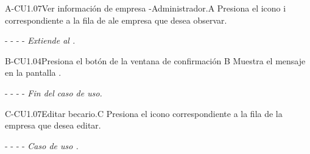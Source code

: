\begin{UCtrayectoriaA}{A-CU1.07}{Ver información de empresa -Administrador.}{A}
	     \UCpaso[\UCactor]Presiona el icono \textcircled{i} correspondiente a la fila de ale empresa que desea observar.
	    \item[- -] - - {\em Extiende al .}
	\end{UCtrayectoriaA}
	
	\begin{UCtrayectoriaA}{B-CU1.04}{Presiona el botón  de la ventana de confirmación }{B}
		\UCpaso[\UCsist] Muestra el mensaje  en la pantalla .
		\item[- -] - - {\em Fin del caso de uso.} 
	\end{UCtrayectoriaA}


	

	
\begin{UCtrayectoriaA}{C-CU1.07}{Editar becario.}{C}
	     \UCpaso[\UCactor]Presiona el icono  \faEdit correspondiente a la fila de la empresa que desea editar.
	     
	    \item[- -] - - {\em Caso de uso .}
	\end{UCtrayectoriaA}